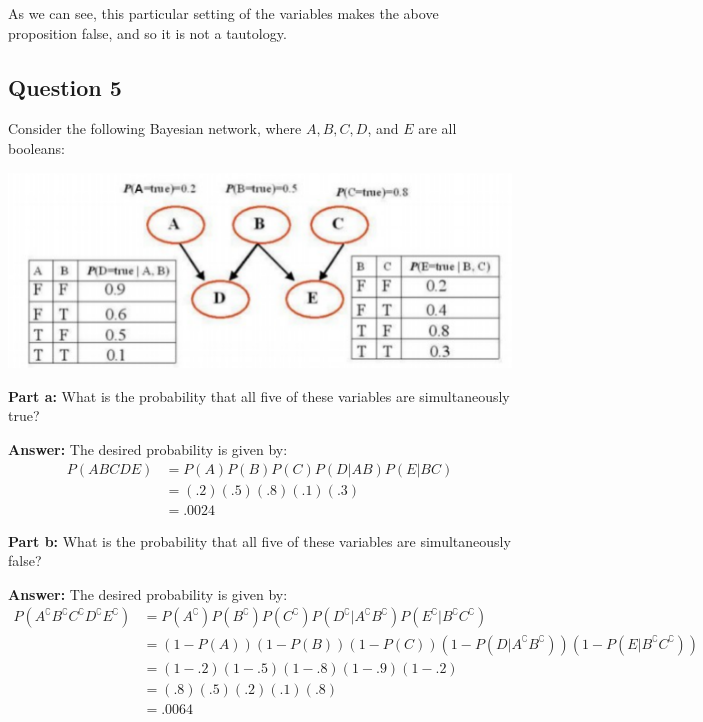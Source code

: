 \documentclass{article}
\begin{document}
As we can see, this particular setting of the variables makes the above proposition false, and so it is not a tautology.

\newpage
\subsection*{Question 5}
Consider the following Bayesian network, where $A,B,C,D$, and $E$ are all booleans:
\begin{center}
  \includegraphics[scale=.75]{baysiannet.png}  
\end{center}
\bigskip

\noindent\textbf{Part a:} What is the probability that all five of these variables are simultaneously true?
\bigskip

\noindent\textbf{Answer:} The desired probability is given by:
\begin{align*}
  P(ABCDE)&=P(A)P(B)P(C)P(D|AB)P(E|BC)\\
  &=(.2)(.5)(.8)(.1)(.3)\\
  &=.0024
\end{align*}

\noindent\textbf{Part b:} What is the probability that all five of these variables are simultaneously false?
\bigskip

\noindent\textbf{Answer:} The desired probability is given by:
\begin{align*}
  P(A^\complement B^\complement C^\complement D^\complement E^\complement)&=P(A^\complement)P(B^\complement)P(C^\complement)P(D^\complement|A^\complement B^\complement)P(E^\complement|B^\complement C^\complement)\\
  &=(1-P(A))(1-P(B))(1-P(C))(1-P(D|A^\complement B^\complement))(1-P(E|B^\complement C^\complement))\\
  &=(1-.2)(1-.5)(1-.8)(1-.9)(1-.2)\\
  &=(.8)(.5)(.2)(.1)(.8)\\
  &=.0064
\end{align*}
\end{document}

